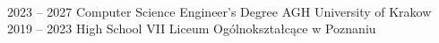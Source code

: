 \documentclass[9pt]{developercv} %
\begin{document}


\begin{minipage}[t]{0.4\textwidth} %
	\vspace{-\baselineskip} %
	
	\lorem \lorem \lorem \lorem \lorem\\ %
\end{minipage}
\hfill %
\begin{minipage}[t]{0.5\textwidth} %
	\vspace{-\baselineskip} %
	\begin{barchart}{5.5}
	\end{barchart}
\end{minipage}




\begin{entrylist}
	\entry
		{2023 -- 2027}
		{Computer Science Engineer's Degree}
		{AGH University of Krakow}
		{\lorem\lorem}
      \entry
		{2019 -- 2023}
		{High School}
		{VII Liceum Ogólnokształcące w Poznaniu}
		{\lorem\lorem}
\end{entrylist}

\end{document}
